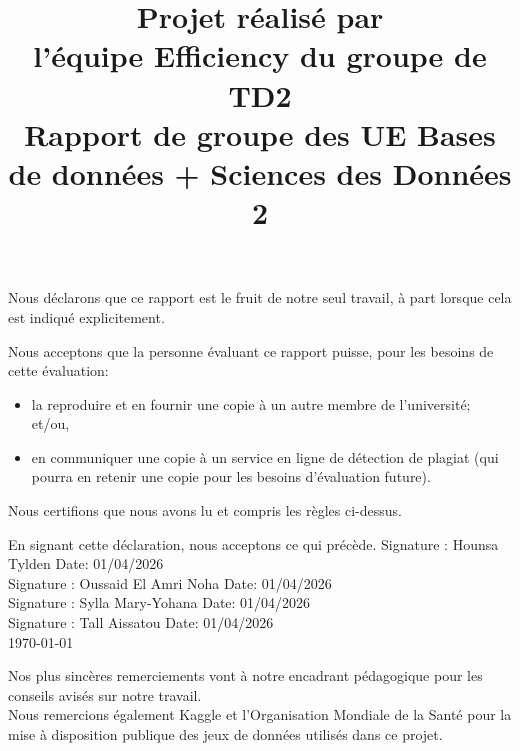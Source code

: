 \documentclass[mstat,12pt]{unswthesis}
\title{Projet réalisé par\\[0.5cm] l'équipe Efficiency du groupe de TD2 \\[3cm]Rapport
de groupe des UE \newline  Bases de données + Sciences des Données 2}
\author{\Authornameonly}
\begin{document}
\beforepreface




\vskip 2pc \noindent Nous déclarons que ce rapport est le fruit de notre seul travail, à part lorsque cela est indiqué  explicitement. 

\vskip 2pc  \noindent Nous acceptons que la personne évaluant ce rapport puisse, pour les besoins de cette évaluation:
\begin{itemize}
\item la reproduire et en fournir une copie à un autre membre de l'université; et/ou,
\item en communiquer une copie à un service en ligne de détection de plagiat (qui pourra en retenir une copie pour les besoins d'évaluation future).
\end{itemize}

\vskip 2pc \noindent Nous certifions que nous avons lu et compris les règles ci-dessus.

\vskip 2pc \noindent En signant cette déclaration, nous acceptons ce qui précède.
\vskip 2pc \noindent
Signature : Hounsa Tylden \hfill Date: 01/04/2026\\[1cm]
Signature : Oussaid El Amri Noha \hfill Date: 01/04/2026 \\[1cm]
Signature : Sylla Mary-Yohana \hfill Date: 01/04/2026 \\[1cm]
Signature : Tall Aissatou \hfill Date: 01/04/2026 \\[1cm]



{\bigskip\bigskip\bigskip\noindent} \today




{\bigskip}Nos plus sincères remerciements vont à notre encadrant
pédagogique pour les conseils avisés sur notre travail.\\[1cm] Nous
remercions également Kaggle et l'Organisation Mondiale de la Santé pour
la mise à disposition publique des jeux de données utilisés dans ce
projet.\\[1cm] 
\end{document}
